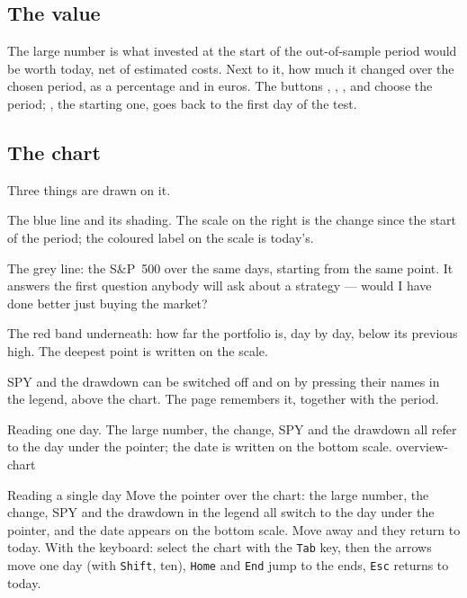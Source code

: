 \subsection{The value}

The large number is what  invested at the start of the
out-of-sample period would be worth today, net of estimated costs. Next to it,
how much it changed over the chosen period, as a percentage and in euros.
The buttons , , ,  and  choose
the period; , the starting one, goes back to the first day of the
test.

\subsection{The chart}

Three things are drawn on it.

\begin{description}[leftmargin = 1.4em, style = nextline, itemsep = 4pt]
  \item[The portfolio] The blue line and its shading. The scale on the
    right is the change since the start of the period; the coloured label
    on the scale is today's.
  \item[SPY] The grey line: the S\&P~500 over the same days, starting from
    the same point. It answers the first question anybody will ask about a
    strategy --- would I have done better just buying the market?
  \item[Drawdown] The red band underneath: how far the portfolio is, day by
    day, below its previous high. The deepest point is written on the scale.
\end{description}

\noindent
SPY and the drawdown can be switched off and on by pressing their names in
the legend, above the chart. The page remembers it, together with the
period.

  {Reading one day. The large number, the change, SPY and the drawdown all
   refer to the day under the pointer; the date is written on the bottom
   scale.}
  {overview-chart}

\begin{pratica}{Reading a single day}
Move the pointer over the chart: the large number, the change, SPY and the
drawdown in the legend all switch to the day under the pointer, and the date
appears on the bottom scale. Move away and they return to today. With the
keyboard: select the chart with the \texttt{Tab} key, then the arrows move one
day (with \texttt{Shift}, ten), \texttt{Home} and \texttt{End} jump to the
ends, \texttt{Esc} returns to today.
\end{pratica}


